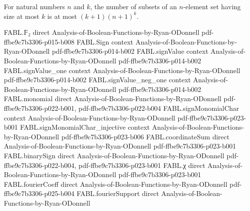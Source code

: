 \begin{theorem}
\label{FABL.card_lowDegreeFourierFamily_le}
\leanok
{}
For natural numbers $n$ and $k$, the number of subsets of an $n$-element set having size
at most $k$ is at most $(k+1)(n+1)^k$.
\end{theorem}

\begin{theorem}
\label{FABL.fourierWeightOutside_lowDegreeFourierFamily}
\leanok
{}
\proofstep
  {FABL.𝔽₂}
  {direct}
  {Analysis-of-Boolean-Functions-by-Ryan-ODonnell}
  {pdf-ffbe9c7b3306-p015-b008}
\proofstep
  {FABL.Sign}
  {context}
  {Analysis-of-Boolean-Functions-by-Ryan-ODonnell}
  {pdf-ffbe9c7b3306-p014-b002}
\proofstep
  {FABL.signValue}
  {context}
  {Analysis-of-Boolean-Functions-by-Ryan-ODonnell}
  {pdf-ffbe9c7b3306-p014-b002}
\proofstep
  {FABL.signValue_one}
  {context}
  {Analysis-of-Boolean-Functions-by-Ryan-ODonnell}
  {pdf-ffbe9c7b3306-p014-b002}
\proofstep
  {FABL.signValue_neg_one}
  {context}
  {Analysis-of-Boolean-Functions-by-Ryan-ODonnell}
  {pdf-ffbe9c7b3306-p014-b002}
\proofstep
  {FABL.monomial}
  {direct}
  {Analysis-of-Boolean-Functions-by-Ryan-ODonnell}
  {pdf-ffbe9c7b3306-p022-b001,
    pdf-ffbe9c7b3306-p022-b004}
\proofstep
  {FABL.signMonomialChar}
  {context}
  {Analysis-of-Boolean-Functions-by-Ryan-ODonnell}
  {pdf-ffbe9c7b3306-p023-b001}
\proofstep
  {FABL.signMonomialChar_injective}
  {context}
  {Analysis-of-Boolean-Functions-by-Ryan-ODonnell}
  {pdf-ffbe9c7b3306-p023-b006}
\proofstep
  {FABL.coordinateSum}
  {direct}
  {Analysis-of-Boolean-Functions-by-Ryan-ODonnell}
  {pdf-ffbe9c7b3306-p023-b001}
\proofstep
  {FABL.binarySign}
  {direct}
  {Analysis-of-Boolean-Functions-by-Ryan-ODonnell}
  {pdf-ffbe9c7b3306-p022-b004,
    pdf-ffbe9c7b3306-p023-b001}
\proofstep
  {FABL.χ}
  {direct}
  {Analysis-of-Boolean-Functions-by-Ryan-ODonnell}
  {pdf-ffbe9c7b3306-p023-b001}
\proofstep
  {FABL.fourierCoeff}
  {direct}
  {Analysis-of-Boolean-Functions-by-Ryan-ODonnell}
  {pdf-ffbe9c7b3306-p025-b004}
\proofstep
  {FABL.fourierSupport}
  {direct}
  {Analysis-of-Boolean-Functions-by-Ryan-ODonnell}

\end{theorem}
